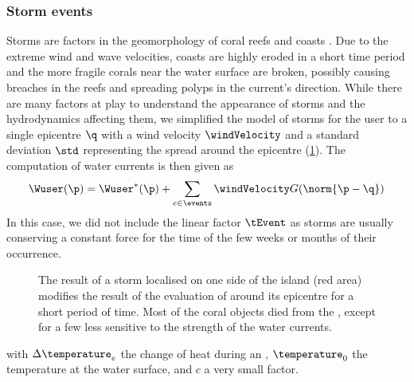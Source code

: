 \subsubsection{Storm events}
Storms are factors in the geomorphology of coral reefs \cite{VilaConcejo2016, Oron2023} and coasts \cite{Dominguez2005, Cowart2010}. Due to the extreme wind and wave velocities, coasts are highly eroded in a short time period and the more fragile corals near the water surface are broken, possibly causing breaches in the reefs and spreading polyps in the current's direction. While there are many factors at play to understand the appearance of storms and the hydrodynamics affecting them, we simplified the model of storms for the user to a single epicentre $\q$ with a wind velocity $\windVelocity$ and a standard deviation $\std$ representing the spread around the epicentre (\cref{fig:env-obj-storm-event}). The computation of water currents is then given as
\begin{align*}
    \Wuser(\p) = \Wuser^*(\p) + \sum_{e \in \events} {\windVelocity G(\norm{\p - \q})}
\end{align*}
In this case, we did not include the linear factor $\tEvent$ as storms are usually conserving a constant force for the time of the few weeks or months of their occurrence. 

\begin{figure}
\caption{The result of a storm localised on one side of the island (red area) modifies the result of the evaluation of  around its epicentre for a short period of time. Most of the coral objects died from the , except for a few  less sensitive to the strength of the water currents.}
\label{fig:env-obj-storm-event}
\end{figure}

with $\Delta \temperature_e$ the change of heat during an , $\temperature_0$ the temperature at the water surface, and $c$ a very small factor.

